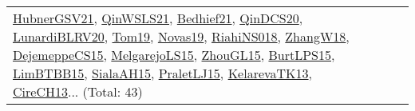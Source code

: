 {\begin{longtable}{lp{3cm}>{\raggedright}p{6cm}>{\raggedright}p{6cm}p{8cm}}
\href{articles/HubnerGSV21.pdf}{HubnerGSV21}\cite{HubnerGSV21}, \href{articles/QinWSLS21.pdf}{QinWSLS21}\cite{QinWSLS21}, \href{articles/Bedhief21.pdf}{Bedhief21}\cite{Bedhief21}, \href{articles/QinDCS20.pdf}{QinDCS20}\cite{QinDCS20}, \href{articles/LunardiBLRV20.pdf}{LunardiBLRV20}\cite{LunardiBLRV20}, \href{papers/Tom19.pdf}{Tom19}\cite{Tom19}, \href{articles/Novas19.pdf}{Novas19}\cite{Novas19}, \href{papers/RiahiNS018.pdf}{RiahiNS018}\cite{RiahiNS018}, \href{articles/ZhangW18.pdf}{ZhangW18}\cite{ZhangW18}, \href{papers/DejemeppeCS15.pdf}{DejemeppeCS15}\cite{DejemeppeCS15}, \href{papers/MelgarejoLS15.pdf}{MelgarejoLS15}\cite{MelgarejoLS15}, \href{papers/ZhouGL15.pdf}{ZhouGL15}\cite{ZhouGL15}, \href{papers/BurtLPS15.pdf}{BurtLPS15}\cite{BurtLPS15}, \href{papers/LimBTBB15.pdf}{LimBTBB15}\cite{LimBTBB15}, \href{papers/SialaAH15.pdf}{SialaAH15}\cite{SialaAH15}, \href{papers/PraletLJ15.pdf}{PraletLJ15}\cite{PraletLJ15}, \href{papers/KelarevaTK13.pdf}{KelarevaTK13}\cite{KelarevaTK13}, \href{papers/CireCH13.pdf}{CireCH13}\cite{CireCH13}... (Total: 43)\\

\end{longtable}}
